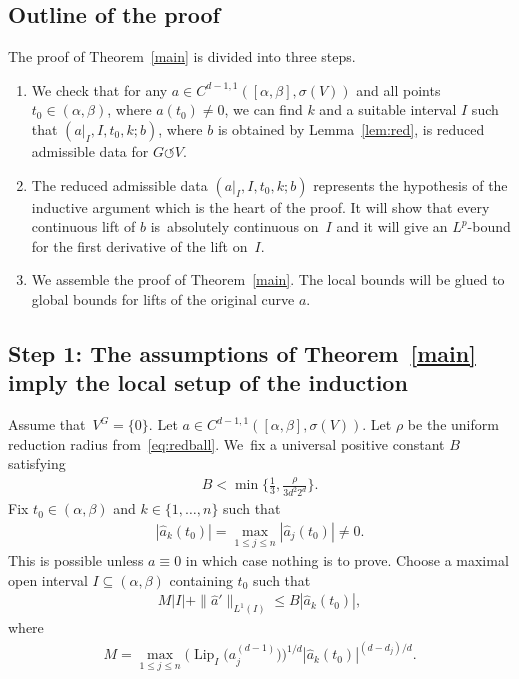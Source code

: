 \documentclass[pdftex]{sigma}
\numberwithin{equation}{section}
\def\al{\alpha}
\def\be{\beta}
\def\rh{\rho}
\def\si{\sigma}
\def\Lip{\on{Lip}}
\def\const{M}
\def\we{\hat}
\def\acts{\circlearrowleft}
\let\on=\operatorname
\begin{document}
\subsection*{Outline of the proof}
The proof of Theorem~\ref{main} is divided into three steps.
\begin{enumerate}\itemsep=0pt
\setlength{\leftskip}{0.45cm}
 \item[{\it Step} 1:] We check that for any $a \in C^{d-1,1}([\al,\be],\si(V))$ and all points $t_0 \in (\al,\be)$, where \mbox{$a(t_0) \ne 0$},
 we can find $k$ and a suitable interval $I$ such that $(a|_I,I,t_0,k;b)$, where $b$ is obtained by Lemma~\ref{lem:red},
 is reduced admissible data for $G \acts V$.
 \item[{\it Step} 2:] The reduced admissible data $(a|_I,I,t_0,k;b)$ represents the hypothesis of the inductive argument which is the heart of the proof.
 It will show that every continuous lift of $b$ is~absolutely continuous on~$I$ and it will give an $L^p$-bound for the first derivative
 of the lift on~$I$.
 \item[{\it Step} 3:] We assemble the proof of Theorem~\ref{main}.
 The local bounds will be glued to global bounds for lifts of the original curve $a$.
 \end{enumerate}










\subsection*{Step 1: The assumptions of Theorem~\ref{main} imply the local setup of the induction}

Assume that~$V^G = \{0\}$.
Let $a \in C^{d-1,1}([\al,\be],\si(V))$. Let $\rh$ be the uniform reduction radius from~\eqref{eq:redball}. We~fix a universal positive constant $B$ satisfying
\begin{gather} \label{eq:constB}
 B < \min\bigg\{\frac1 3, \frac{\rh}{3 d^2 2^{d}}\bigg\}.
\end{gather}
Fix $t_0 \in (\al,\be)$ and $k \in \{1,\dots,n\}$ such that
\begin{gather} \label{k}
 |\we a_k(t_0)| = \max_{1 \le j \le n} |\we a_j(t_0)|\ne 0.
\end{gather}
This is possible unless $a \equiv 0$ in which case nothing is to prove.
Choose a maximal open interval $I \subseteq (\al,\be)$ containing $t_0$ such that
\begin{gather}\label{assumption<=}
\const |I| + \|\we a'\|_{L^1 (I)} \le B |\we a_k(t_0)|,
\end{gather}
where
\begin{gather} \label{M}
 \const = \max_{1 \le j\le n} \big(\Lip_I\big(a_j^{(d-1)}\big)\big)^{1/d} |\we a_k (t_0)|^{(d-d_j)/ d}.
\end{gather}
\end{document}
